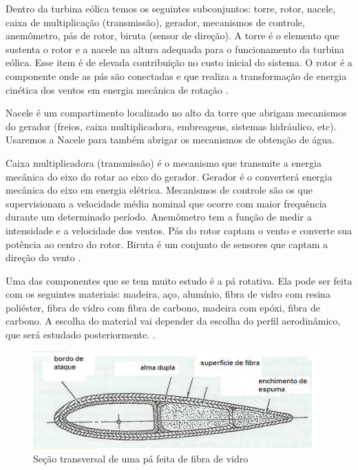 Dentro da turbina eólica temos os seguintes subconjuntos: torre, rotor, nacele, caixa de multiplicação (transmissão),
gerador, mecanismos de controle, anemômetro, pás de rotor, biruta (sensor de direção). A torre é o elemento que sustenta
o rotor e a nacele na altura adequada para o funcionamento da turbina eólica. Esse item é de elevada contribuição no custo 
inicial do sistema. O rotor é a componente onde as pás são conectadas e que realiza a transformação de energia cinética dos
ventos em energia mecânica de rotação \cite{rossiEtAl}.

Nacele é um compartimento localizado no alto da torre que abrigam mecanismos do gerador (freios, caixa multiplicadora,
embreagens, sistemas hidráulico, etc). Usaremos a Nacele para também abrigar os mecanismos de obtenção de água. 
	
Caixa multiplicadora (transmissão) é o mecanismo que transmite a energia mecânica do eixo do rotar ao eixo do gerador.
Gerador é o converterá energia mecânica do eixo em energia elétrica. Mecanismos de controle são os que supervisionam a 
velocidade média nominal que ocorre com maior frequência durante um determinado período. Anemômetro tem a função de medir
a intensidade e a velocidade dos ventos. Pás do rotor captam o vento e converte sua potência ao centro do rotor.
Biruta é um conjunto de sensores que captam a direção do vento \cite{rossiEtAl}.
	
Uma das componentes que se tem muito estudo é a pá rotativa. Ela pode ser feita com os seguintes materiais: 
madeira, aço, alumínio, fibra de vidro com resina poliéster, fibra de vidro com fibra de carbono, madeira com epóxi,
fibra de carbono. A escolha do material vai depender da escolha do perfil aerodinâmico, que será estudado posteriormente.
\cite{portalEnergia}.

\begin{figure}[!htbp]
\centering
\includegraphics[scale=0.80]{editaveis/figuras/pa}
\caption[Seção transversal de uma pá feita de fibra de vidro]{Seção transversal de uma pá feita de fibra de vidro\footnotemark}
\FloatBarrier
\label{secao_transversal_pa}
\end{figure}


